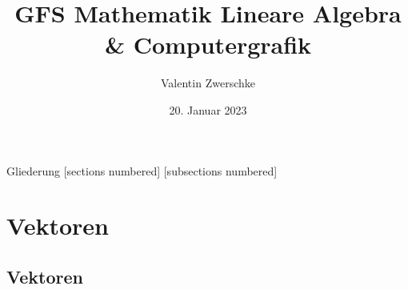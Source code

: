 \documentclass[10pt,aspectratio=169]{beamer}
\title{GFS Mathematik Lineare Algebra \& Computergrafik}
\date{20. Januar 2023}
\author{Valentin Zwerschke}
\institute{Königin-Olga-Stift Gymnasium}
\begin{document}
  \maketitle


  \begin{frame}{Gliederung}
	[sections numbered]
	[subsections numbered]
	\tableofcontents[hideallsubsections]
  \end{frame}

  \section{Vektoren}
  \subsection{Vektoren}
\end{document}
